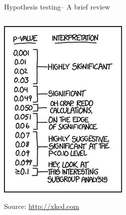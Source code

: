 \documentclass[ignorenonframetext,]{beamer}
\begin{document}
\begin{frame}{Hypothesis testing-- A brief review}
\begin{columns}
\begin{column}{0.35\textwidth}
\begin{center}\includegraphics[width=\textwidth]{images/p_values} \end{center}
\footnotesize{Source: \url{http://xkcd.com}}
\end{column}
\end{columns}

\end{frame}
\end{document}
